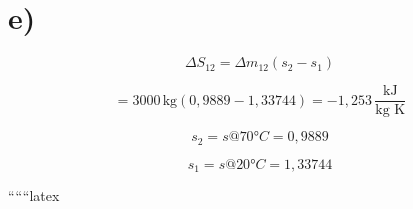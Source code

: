 

\section*{e)}

\[
\Delta S_{12} = \Delta m_{12} (s_{2} - s_{1})
\]

\[
= 3000 \, \text{kg} (0,9889 - 1,33744) = -1,253 \, \frac{\text{kJ}}{\text{kg K}}
\]

\[
s_{2} = s @ 70°C = 0,9889
\]

\[
s_{1} = s @ 20°C = 1,33744
\]

``````latex